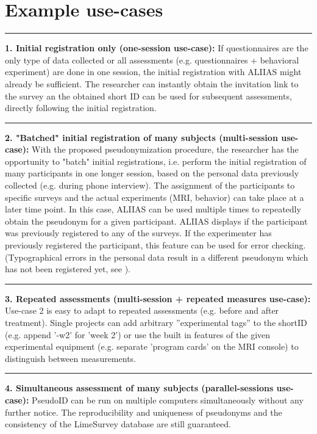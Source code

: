 \section{Example use-cases}
\label{use-case:one-session}
\par\noindent\rule{\textwidth\color{pniblue}}{0.4pt}
\textbf{1. Initial registration only (one-session use-case):}
If questionnaires are the only type of data collected or all assessments (e.g. questionnaires + behavioral experiment) are done in one session, the initial registration with ALIIAS might already be sufficient. The researcher can instantly obtain the invitation link to the survey an the obtained short ID can be used for subsequent assessments, directly following the initial registration.

\par\noindent\rule{\textwidth\color{pniblue}}{0.4pt}
\textbf{2. "Batched" initial registration of many subjects (multi-session use-case):}
With the proposed pseudonymization procedure, the researcher has the opportunity to "batch" initial registrations, i.e. perform the initial registration of many participants in one longer session, based on the personal data previously collected (e.g. during phone interview). The assignment of the participants to specific surveys and the actual experiments (MRI, behavior) can take place at a later time point. In this case, ALIIAS can be used multiple times to repeatedly obtain the pseudonym for a given participant. ALIIAS displays if the participant was previously registered to any of the surveys. If the experimenter has previously registered the participant, this feature can be used for error checking. (Typographical errors in the personal data result in a different pseudonym which has not been registered yet, see ).

\par\noindent\rule{\textwidth\color{pniblue}}{0.4pt}
\textbf{3. Repeated assessments (multi-session + repeated measures use-case):}
Use-case 2 is easy to adapt to repeated assessments (e.g. before and after treatment). Single projects can add arbitrary ”experimental tags” to the shortID (e.g. append ’-w2’ for 'week 2') or use the built in features of the given experimental equipment (e.g. separate ’program cards’ on the MRI console) to distinguish between measurements. 

\par\noindent\rule{\textwidth\color{pniblue}}{0.4pt}
\textbf{4. Simultaneous assessment of many subjects (parallel-sessions use-case):}
PseudoID can be run on multiple computers simultaneously without any further notice. The reproducibility and uniqueness of pseudonyms and the consistency of the LimeSurvey database are still guaranteed.

